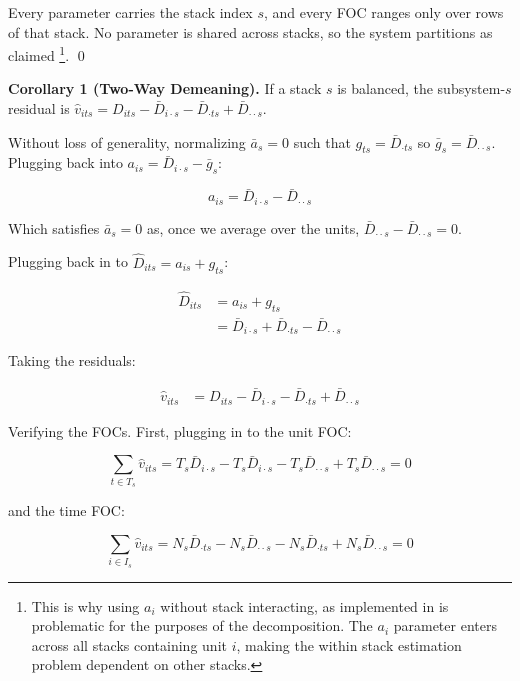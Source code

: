 \documentclass[12pt]{article}
\begin{document}
Every parameter carries the stack index $s$, and every FOC ranges only over rows of that stack. No parameter is shared across stacks, so the system partitions as claimed \footnote{This is why using $a_i$ without stack interacting, as implemented in \textcite{payson2025residency} is problematic for the purposes of the decomposition. The $a_i$ parameter enters across all stacks containing unit $i$, making the within stack estimation problem dependent on other stacks.}. \qed 

\textbf{Corollary 1 (Two-Way Demeaning).} If a stack $s$ is balanced, the subsystem-$s$ residual is $\hat{v}_{its} = D_{its} - \bar{D}_{i \cdot s} - \bar{D}_{\cdot ts} + \bar{D}_{\cdot \cdot s}$.

Without loss of generality, normalizing $\bar{a}_s = 0$ such that $g_{ts} = \bar{D}_{\cdot t s}$ so $\bar{g}_s = \bar{D}_{\cdot \cdot s}$. Plugging back into $a_{is} = \bar{D}_{i \cdot s} - \bar{g}_s$:

\begin{equation*}
    a_{is} = \bar{D}_{i \cdot s} - \bar{D}_{\cdot \cdot s}
\end{equation*}

Which satisfies $\bar{a}_s = 0$ as, once we average over the units, $\bar{D}_{\cdot \cdot s} - \bar{D}_{\cdot \cdot s} = 0$.

Plugging back in to $\hat{D}_{its} = a_{is} + g_{ts}$:

\begin{align*}
    \hat{D}_{its} &= a_{is} + g_{ts} \\
    &= \bar{D}_{i \cdot s} + \bar{D}_{\cdot t s} - \bar{D}_{\cdot \cdot s}
\end{align*}

Taking the residuals:

\begin{align*}
    \hat{v}_{its} &= D_{its} - \bar{D}_{i \cdot s} - \bar{D}_{\cdot t s} + \bar{D}_{\cdot \cdot s}
\end{align*}

Verifying the FOCs. First, plugging in to the unit FOC:

\begin{equation*}
    \sum_{t \in  T_s} \hat{v}_{its} = T_s\bar{D}_{i \cdot s} - T_s\bar{D}_{i \cdot s} - T_s\bar{D}_{\cdot \cdot s} + T_s\bar{D}_{\cdot \cdot s} = 0
\end{equation*}

and the time FOC:

\begin{equation*}
    \sum_{i \in I_s} \hat{v}_{its} = N_s \bar{D}_{\cdot t s} - N_s \bar{D}_{\cdot \cdot s} - N_s \bar{D}_{\cdot t s} + N_s \bar{D}_{\cdot \cdot s} = 0
\end{equation*}
\end{document}

